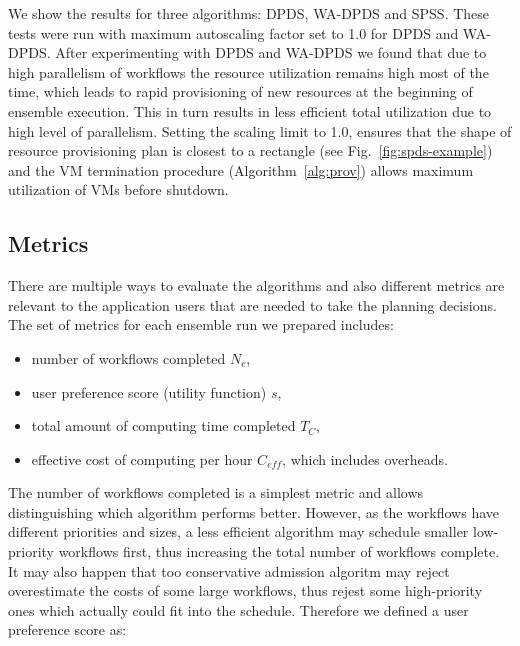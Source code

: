 \documentclass{sig-alternate}
\begin{document}
We show the results for three algorithms: DPDS, WA-DPDS and
SPSS. These tests were run with maximum autoscaling factor set to 1.0 for
DPDS and WA-DPDS. After experimenting with DPDS and WA-DPDS we found that due to
high parallelism of workflows the resource utilization remains high most of the time, 
which leads to rapid provisioning of new resources at the beginning of ensemble
execution. This in turn results in less efficient total utilization due to high
level of parallelism. Setting the scaling limit to 1.0, ensures that the shape
of resource provisioning plan is closest to a rectangle (see
Fig.~\ref{fig:spds-example}) and the VM termination procedure
(Algorithm~\ref{alg:prov}) allows maximum utilization of VMs before shutdown.




\subsection{Metrics}




There are multiple ways to evaluate the algorithms and also different metrics
are relevant to the application users that are needed to take the planning
decisions. The set of metrics for each ensemble run we prepared includes:
\begin{itemize}
  \item number of workflows completed $N_c$,
  \item user preference score (utility function) $s$,
  \item total amount of computing time completed $T_C$,
  \item effective cost of computing per hour $C_{eff}$, which includes
  overheads.
\end{itemize}


The number of workflows completed is a simplest metric and allows distinguishing
which algorithm performs better. However, as the workflows have
different priorities and sizes, a less efficient algorithm may schedule smaller
low-priority workflows first, thus increasing the total number of workflows
complete. It may also happen that too conservative admission algoritm may reject
overestimate the costs of some large workflows, thus rejest some high-priority
ones which actually could fit into the schedule. Therefore we defined a user
preference score as:

\end{document}

